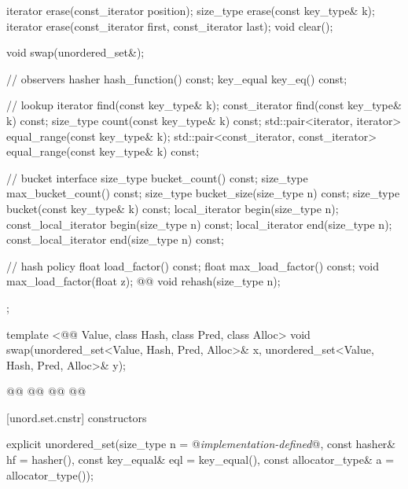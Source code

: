 \documentclass[american,twoside]{book}
\begin{document}
\begin{codeblock}
{{    iterator erase(const_iterator position);
    size_type erase(const key_type& k);
    iterator erase(const_iterator first, const_iterator last);
    void clear();

    void swap(unordered_set&);

    // observers
    hasher hash_function() const;
    key_equal key_eq() const;

    // lookup
    iterator       find(const key_type& k);
    const_iterator find(const key_type& k) const;
    size_type count(const key_type& k) const;
    std::pair<iterator, iterator>             equal_range(const key_type& k);
    std::pair<const_iterator, const_iterator> equal_range(const key_type& k) const;

    // bucket interface
    size_type bucket_count() const;
    size_type max_bucket_count() const;
    size_type bucket_size(size_type n) const;
    size_type bucket(const key_type& k) const;
    local_iterator begin(size_type n);
    const_local_iterator begin(size_type n) const;
    local_iterator end(size_type n);
    const_local_iterator end(size_type n) const;  

    // hash policy
    float load_factor() const;
    float max_load_factor() const;
    void max_load_factor(float z);
    @@ void rehash(size_type n);
  };

  template <@@ Value, class Hash, class Pred, class Alloc>
    void swap(unordered_set<Value, Hash, Pred, Alloc>& x,
              unordered_set<Value, Hash, Pred, Alloc>& y);

  @@
    @@
      @@
        @@
}
\end{codeblock}

[unord.set.cnstr]{ constructors}

%
\begin{itemdecl}
explicit unordered_set(size_type n = @\textit{implementation-defined}@,
                       const hasher& hf = hasher(),
                       const key_equal& eql = key_equal(),
                       const allocator_type& a = allocator_type());
\end{itemdecl}
\end{document}
